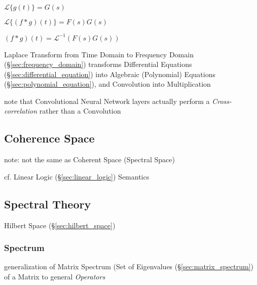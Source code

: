 $\mathcal{L}\{g(t)\} = G(s)$

$\mathcal{L}\{(f * g)(t)\} = F(s)G(s)$

$(f*g)(t) = \mathcal{L}^{-1}(F(s)G(s))$

Laplace Transform from Time Domain to Frequency Domain
(\S\ref{sec:frequency_domain}) transforms Differential Equations
(\S\ref{sec:differential_equation}) into Algebraic (Polynomial) Equations
(\S\ref{sec:polynomial_equation}), and Convolution into Multiplication

note that Convolutional Neural Network layers actually perform a
\emph{Cross-correlation} rather than a Convolution



\subsection{Coherence Space}\label{sec:coherence_space}

note: not the same as Coherent Space (Spectral Space)

cf. Linear Logic (\S\ref{sec:linear_logic}) Semantics



\subsection{Spectral Theory}\label{sec:spectral_theory}

Hilbert Space (\S\ref{sec:hilbert_space})



\subsubsection{Spectrum}\label{sec:spectrum}

generalization of Matrix Spectrum (Set of Eigenvalues
(\S\ref{sec:matrix_spectrum}) of a Matrix to general \emph{Operators}

